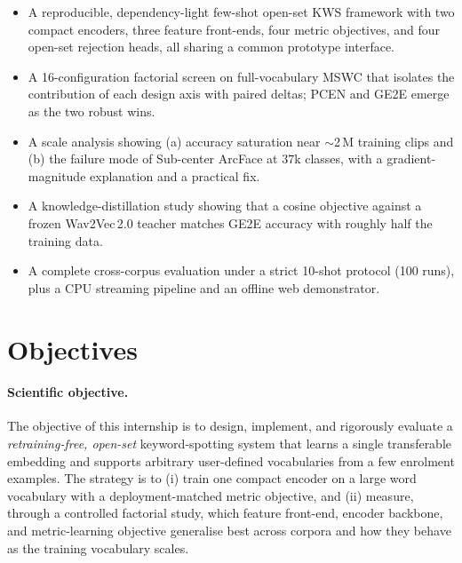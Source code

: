 \documentclass[12pt,a4paper]{article}
\begin{document}
\begin{itemize}[leftmargin=1.4em,itemsep=2pt]
\item A reproducible, dependency-light few-shot open-set KWS framework with two
compact encoders, three feature front-ends, four metric objectives, and four
open-set rejection heads, all sharing a common prototype interface.
\item A 16-configuration factorial screen on full-vocabulary MSWC that isolates
the contribution of each design axis with paired deltas; PCEN and GE2E emerge as
the two robust wins.
\item A scale analysis showing (a) accuracy saturation near $\sim$2\,M training
clips and (b) the failure mode of Sub-center ArcFace at $37$k classes, with a
gradient-magnitude explanation and a practical fix.
\item A knowledge-distillation study showing that a cosine objective against a
frozen Wav2Vec\,2.0 teacher matches GE2E accuracy with roughly half the training
data.
\item A complete cross-corpus evaluation under a strict 10-shot protocol (100
runs), plus a CPU streaming pipeline and an offline web demonstrator.
\end{itemize}

\section{Objectives}\label{sec:objectives}

\paragraph{Scientific objective.}
The objective of this internship is to design, implement, and rigorously evaluate
a \emph{retraining-free, open-set} keyword-spotting system that learns a single
transferable embedding and supports arbitrary user-defined vocabularies from a
few enrolment examples. The strategy is to (i) train one compact encoder on a
large word vocabulary with a deployment-matched metric objective, and (ii)
measure, through a controlled factorial study, which feature front-end, encoder
backbone, and metric-learning objective generalise best across corpora and how
they behave as the training vocabulary scales.
\end{document}
